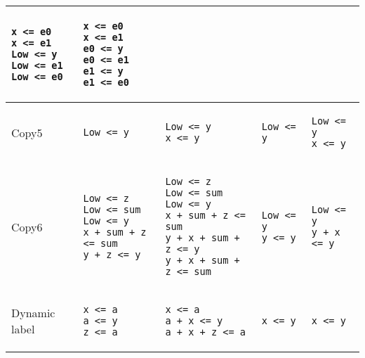 \documentclass{article}
\begin{document}
\begin{tabular}{|l|l|l|l|l|}
\begin{lstlisting}
x <= e0
x <= e1
Low <= y
Low <= e1
Low <= e0
\end{lstlisting}&
\begin{lstlisting}
x <= e0
x <= e1
e0 <= y
e0 <= e1
e1 <= y
e1 <= e0
\end{lstlisting}
\\
\hline
Copy5&
\begin{lstlisting}
Low <= y
\end{lstlisting} &
\begin{lstlisting}
Low <= y
x <= y
\end{lstlisting}&
\begin{lstlisting}
Low <= y 
\end{lstlisting}&
\begin{lstlisting}
Low <= y
x <= y
\end{lstlisting}\\
\hline
Copy6&
\begin{lstlisting}
Low <= z
Low <= sum
Low <= y
x + sum + z <= sum
y + z <= y
\end{lstlisting}&
\begin{lstlisting}
Low <= z
Low <= sum
Low <= y
x + sum + z <= sum
y + x + sum + z <= y
y + x + sum + z <= sum
\end{lstlisting} &
\begin{lstlisting}
Low <= y
y <= y  
\end{lstlisting}&
\begin{lstlisting}
Low <= y
y + x <= y
\end{lstlisting}\\
\hline
Dynamic label&
\begin{lstlisting}
x <= a
a <= y
z <= a
\end{lstlisting}&
\begin{lstlisting}
x <= a
a + x <= y
a + x + z <= a
\end{lstlisting} &
\begin{lstlisting}
x <= y
\end{lstlisting}&
\begin{lstlisting}
x <= y
\end{lstlisting}\\
\hline
\end{tabular}
\end{document}
